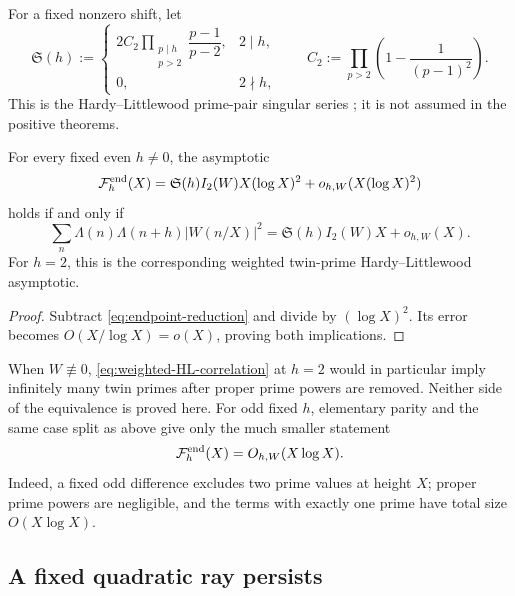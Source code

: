 For a fixed nonzero shift, let
\begin{equation}
 \mathfrak S(h):=
 \begin{cases}
 2C_2\displaystyle\prod_{\substack{p\mid h\\p>2}}
 \dfrac{p-1}{p-2},&2\mid h,\\[0.8em]
 0,&2\nmid h,
 \end{cases}
 \qquad
 C_2:=\prod_{p>2}\left(1-\frac1{(p-1)^2}\right).
 \label{eq:prime-pair-singular-series}
\end{equation}
This is the Hardy--Littlewood prime-pair singular series
\citep{HardyLittlewood1923}; it is not assumed in the positive theorems.

\begin{corollary}
\label{cor:endpoint-HL-equivalence}
For every fixed even $h\ne0$, the asymptotic
\begin{equation}
 \mathcal F_h^{\rm end}(X)
 =\mathfrak S(h)I_2(W)X(\log X)^2
 +o_{h,W}(X(\log X)^2)
 \label{eq:endpoint-predicted-asymptotic}
\end{equation}
holds if and only if
\begin{equation}
 \sum_n\Lambda(n)\Lambda(n+h)|W(n/X)|^2
 =\mathfrak S(h)I_2(W)X+o_{h,W}(X).
 \label{eq:weighted-HL-correlation}
\end{equation}
For $h=2$, this is the corresponding weighted twin-prime
Hardy--Littlewood asymptotic.
\end{corollary}

\begin{proof}
Subtract \eqref{eq:endpoint-reduction} and divide by $(\log X)^2$.
Its error becomes $O(X/\log X)=o(X)$, proving both implications.
\end{proof}

When $W\not\equiv0$, \eqref{eq:weighted-HL-correlation} at $h=2$ would
in particular imply infinitely many twin primes after proper prime
powers are removed.  Neither side of the equivalence is proved here.
For odd fixed $h$, elementary parity and the same case split as above
give only the much smaller statement
\begin{equation}
 \mathcal F_h^{\rm end}(X)=O_{h,W}(X\log X).
\label{eq:odd-endpoint-bound}
\end{equation}
Indeed, a fixed odd difference excludes two prime values at height
$X$; proper prime powers are negligible, and the terms with exactly one
prime have total size $O(X\log X)$.

\subsection{A fixed quadratic ray persists}

